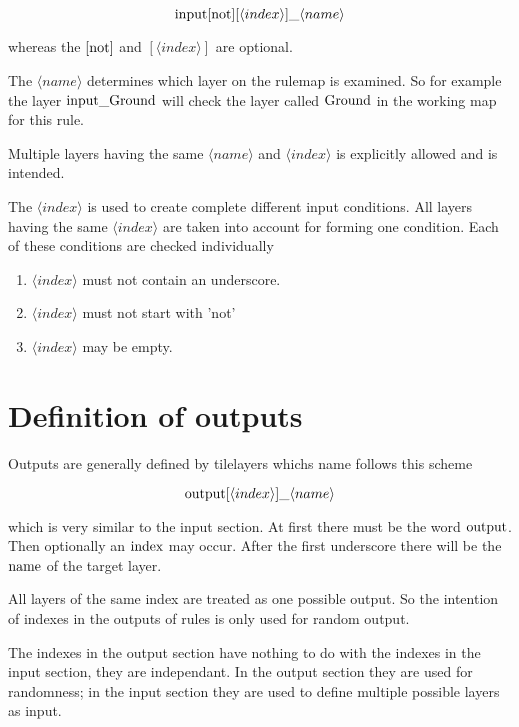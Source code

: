 \documentclass[dvips, a4paper, 12pt,listof=totoc, oneside, parskip]{scrbook}
\begin{document}
$$\textup{input}[\textup{not}] [\langle index \rangle]  \_ \langle name \rangle$$

whereas the $[\textup{not}]$ and $[\langle index \rangle]$ are optional.

The $\langle name \rangle$ determines which layer on the rulemap is examined.
So for example the layer $\textup{input}\_\textup{Ground}$ will check the
layer called $\textup{Ground}$ in the working map for this rule.

Multiple layers having the same $\langle name \rangle$ and $\langle index \rangle$
is explicitly allowed and is intended.

The $\langle index \rangle$ is used to create complete different input conditions.
All layers having the same $\langle index \rangle$ are taken into account for forming one
condition. Each of these conditions are checked individually

\begin{enumerate}
  \item $\langle index \rangle$ must not contain an underscore.
  \item $\langle index \rangle$ must not start with 'not'
  \item $\langle index \rangle$ may be empty.
\end{enumerate}






\section{Definition of outputs}

Outputs are generally defined by tilelayers whichs name follows this scheme

$$\textup{output}[\langle index \rangle]  \_ \langle name \rangle$$

which is very similar to the input section. At first there must be the word $\textup{output}$.
Then optionally an $\textup{index}$ may occur. After the first underscore there will be the
$\textup{name}$ of the target layer.

All layers of the same index are treated as one possible output.
So the intention of indexes in the outputs of rules is only used for random
output.

The indexes in the output section have nothing to do with the indexes in the input section,
they are independant. In the output section they are used for randomness; in the input section
they are used to define multiple possible layers as input.
\end{document}
